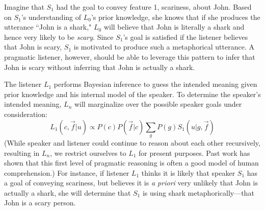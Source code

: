 \documentclass[10pt,letterpaper]{article}
\begin{document}
Imagine that $S_1$ had the goal to convey feature 1, scariness, about John.
Based on $S_1$'s understanding of $L_0$'s prior knowledge, she knows that if she produces the utterance ``John is a shark," $L_0$ will believe that John is literally a shark and hence very likely to be \emph{scary}. Since $S_1$'s goal is satisfied if the listener believes that John is scary, $S_1$ is motivated to produce such a metaphorical utterance. A pragmatic listener, however, should be able to leverage this pattern to infer that John is scary without inferring that John is actually a shark.


The listener $L_1$ performs Bayesian inference to guess the intended meaning given prior knowledge and his internal model of the speaker. To determine the speaker's intended meaning, $L_n$ will marginalize over the possible speaker goals under consideration:
$$
L_1 (c, \vec f | u) \propto P(c) P(\vec f | c) \sum_{g}{P (g) S_1 (u|g, \vec f)}
$$
(While speaker and listener could continue to reason about each other recursively, resulting in $L_n$, we restrict ourselves to $L_1$ for present purposes. Past work has shown that this first level of pragmatic reasoning is often a good model of human comprehension.)
For instance, if listener $L_1$ thinks it is likely that speaker $S_1$ has a goal of conveying scariness, but believes it is \emph{a priori} very unlikely that John is actually a shark, she will determine that $S_1$ is using shark metaphorically---that John is a scary person.
\end{document}
